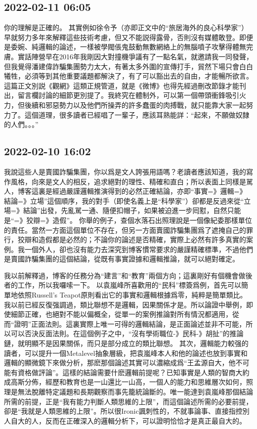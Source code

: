 \documentclass[twocolumn]{ctexart}
\begin{document}
\subsection*{2022-02-11 06:05}

你的理解是正確的。
其實例如徐令予（亦即正文中的“旅居海外的良心科學家”）早就努力多年來解釋這些技術考慮，但又不能説得露骨，否則沒有媒體敢登。即便是委婉、純邏輯的論述，一樣被學閥倀鬼鼓動無數網絡上的無腦噴子攻擊得體無完膚。實話陣營早在2016年我剛因大對撞機爭議有了一點名氣，就邀請我一同發聲，但我覺得潘建偉詐騙集團勢力太大，有著太多外圍的宣傳打手，貿然下場只會白白犧牲，必須等到其他重要議題都解決了，有了可以豁出去的自由，才能暢所欲言。
這篇正文別説《觀網》這類正規管道，就是《微博》也得先經過刪改節錄才能刊出，留言欄討論的細節更別提了。我終究在體制外，可以第一個帶頭衝鋒吸引火力，但後續和邪惡勢力以及他們所操弄的許多蠢蛋的肉搏戰，就只能靠大家一起努力了。這個道理，很多讀者已經唱了一輩子，應該耳熟能詳：“起來，不願做奴隸的人們。。。”
\subsection*{2022-02-10 16:02}

我說這些人是賣國詐騙集團，你以爲是文人誇張用語嗎？老讀者應該知道，我的寫作風格，向來是文人的相反，追求絕對的理性、精確和直白；所以表面上同樣是駡人，博客這裏是經過嚴謹邏輯推演得到的必然正確結論，亦即“事實=》邏輯=》結論=》立場”這個順序，我的對手（即使名義上是“科學家”）卻都是反過來從“立場=》結論”出發，先亂駡一通、隨便扣帽子，如果被迫進一步囘懟，自然只能是“=》狡辯=》造假”。
你舉的例子，查個水落石出照理說是一個像紀委那樣單位的責任。當然一方面這個單位不存在，但另一方面賣國詐騙集團爲了遮掩自己的罪行，狡辯和造假都是必然的；不論你的論述是否精確，實際上必然有許多真實的案例。我一個外人，卻也沒有能力去深究到博客慣常要求的嚴謹精確標準，不過他們是賣國詐騙集團的這個結論，從既有事實證據和邏輯推論，就可以絕對確定。

我以前解釋過，博客的任務分為“建言”和“教育”兩個方向；這裏剛好有個機會做後者的工作，所以我囉嗦一下。
以袁嵐峰所喜歡用的“民科”標簽爲例，首先可以簡單地依照Russell's Teapot原則看出它的事實和邏輯根據爲零，純粹是簡單類比。我以前已經反復强調過，類比聯想不是邏輯，因果關係才是。所以論證中舉例，即使細節正確，也絕對不能以偏概全，從單一的案例推論對所有情況都適用，從而“證明”正面法則。這裏實際上唯一可得的邏輯結論，是正面論述並非不可能，所以可以否決反面法則。在這個例子之中，“沒有學術職位-》民科-》胡扯”的推論鏈，就明顯不是因果關係，而只是部分成立的類比聯想。
其次，邏輯能力較强的讀者，可以提升一個Metalevel抽象層級，把袁嵐峰本人和他的論述也放到事實和邏輯的顯微鏡下來做分析，那麽那個論述其實可以濃縮成爲“王孟源自大，他不可能有資格做評論”。這樣的結論需要什麽邏輯前提呢？已知事實是人類的智商大約成高斯分佈，經歷和教育也是一山還比一山高，一個人的能力和思維層次如何，照理是無法脫離特定議題和長期觀察而事先籠統論斷的。唯一能達到袁嵐峰那個結論所需的前提，正是“我有能力判斷人類思維的上限”，而這個論述所需的必要前提，卻是“我就是人類思維的上限”。所以很Ironic諷刺性的，不就事論事、直接指控別人自大的人，反而在正確深入的邏輯分析下，可以證明恰恰才是真正最自大的。
\end{document}
